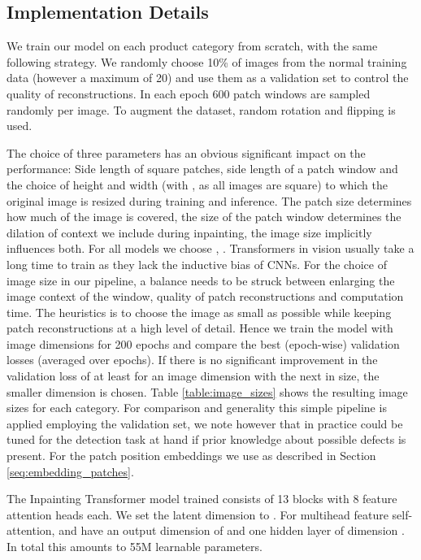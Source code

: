 \documentclass[final,5p,times,twocolumn]{elsarticle}
\begin{document}
	\subsection{Implementation Details}
	\label{seq:implementation_details}
	
	We train our model on each product category from scratch, with the same following strategy. We randomly choose 10\% of images from the normal training data (however a maximum of 20) and use them as a validation set to control the quality of reconstructions. In each epoch 600 patch windows are sampled randomly per image. To augment the dataset, random rotation and flipping is used.
	
	The choice of three parameters has an obvious significant impact on the performance: Side length  of square patches, side length  of a patch window and the choice of height  and width  (with , as all images are square) to which the original image is resized during training and inference. The patch size determines how much of the image is covered, the size of the patch window determines the dilation of context we include during inpainting, the image size implicitly influences both. For all models we choose , . Transformers in vision usually take a long time to train as they lack the inductive bias of CNNs. For the choice of image size in our pipeline, a balance needs to be struck between enlarging the image context of the  window, quality of patch reconstructions and computation time. The heuristics is to choose the image as small as possible while keeping patch reconstructions at a high level of detail. Hence we train the model with image dimensions  for 200 epochs and compare the best (epoch-wise) validation losses (averaged over  epochs). If there is no significant improvement in the validation loss of at least  for an image dimension with the next in size, the smaller dimension is chosen. Table \ref{table:image_sizes} shows the resulting image sizes for each category. For comparison and generality this simple pipeline is applied employing the validation set, we note however that in practice  could be tuned for the detection task at hand if prior knowledge about possible defects is present. For the patch position embeddings we use  as described in Section \ref{seq:embedding_patches}. 
	
	The Inpainting Transformer model trained consists of 13 blocks with 8 feature attention heads each. We set the latent dimension to . For multihead feature self-attention,  and  have an output dimension of  and one hidden layer of dimension . In total this amounts to 55M learnable parameters. 
	
\end{document}
